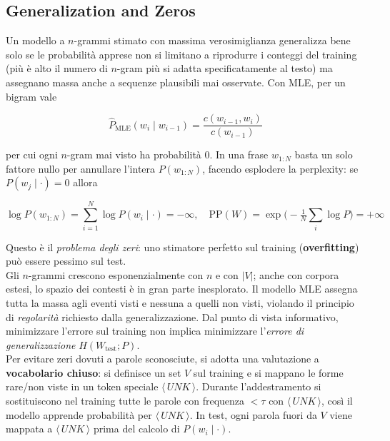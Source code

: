     \subsection{Generalization and Zeros}
    
        Un modello a $n$-grammi stimato con massima verosimiglianza generalizza bene solo se le probabilità apprese non si limitano a riprodurre i conteggi del training (più è alto il numero di $n$-gram più si adatta specificatamente al testo) ma assegnano massa anche a sequenze plausibili mai osservate. Con MLE, per un bigram vale
        
        $$
        \hat P_{\text{MLE}}(w_i\mid w_{i-1}) = \frac{c(w_{i-1},w_i)}{c(w_{i-1})}
        $$
        
        per cui ogni $n$-gram mai visto ha probabilità $0$. In una frase $w_{1:N}$ basta un solo fattore nullo per annullare l’intera $P(w_{1:N})$, facendo esplodere la perplexity: se \;$P(w_j\mid\cdot)=0$\; allora
        
        $$
        \log P(w_{1:N}) = \sum_{i=1}^{N}\log P(w_i\mid\cdot) = -\infty,\quad \mathrm{PP}(W)=\exp\!\Big(-\tfrac{1}{N}\sum_i \log P\Big)=+\infty
        $$
        
        Questo è il \textit{problema degli zeri}: uno stimatore perfetto sul training (\textbf{overfitting}) può essere pessimo sul test.\\

        Gli $n$-grammi crescono esponenzialmente con $n$ e con $|V|$; anche con corpora estesi, lo spazio dei contesti è in gran parte inesplorato. Il modello MLE assegna tutta la massa agli eventi visti e nessuna a quelli non visti, violando il principio di \textit{regolarità} richiesto dalla generalizzazione. Dal punto di vista informativo, minimizzare l’errore sul training non implica minimizzare l’\textit{errore di generalizzazione} $H(W_{\text{test}};P)$.\\        
        
        Per evitare zeri dovuti a parole sconosciute, si adotta una valutazione a \textbf{vocabolario chiuso}: si definisce un set $V$ sul training e si mappano le forme rare/non viste in un token speciale $\langle\,UNK\,\rangle$. Durante l’addestramento si sostituiscono nel training tutte le parole con frequenza $<\tau$ con $\langle\,UNK\,\rangle$, così il modello apprende probabilità per $\langle\,UNK\,\rangle$. In test, ogni parola fuori da $V$ viene mappata a $\langle\,UNK\,\rangle$ prima del calcolo di $P(w_i\mid\cdot)$.
        
